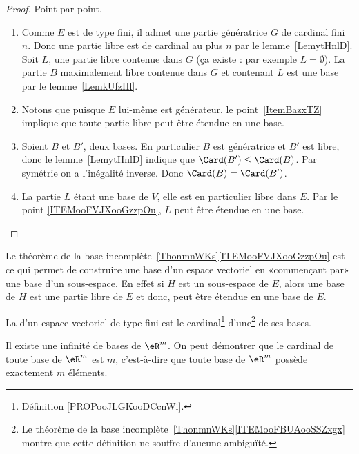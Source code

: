 \begin{proof}
	Point par point.
	\begin{enumerate}
		\item
		      Comme \( E\) est de type fini, il admet une partie génératrice \( G\) de cardinal fini \( n\). Donc une partie libre est de cardinal au plus \( n\) par le lemme~\ref{LemytHnlD}. Soit \( L\), une partie libre contenue dans \( G\) (ça existe : par exemple \( L=\emptyset\)). La partie \( B\) maximalement libre contenue dans \( G\) et contenant \( L\) est une base par le lemme~\ref{LemkUfzHl}.
		\item
		      Notons que puisque \( E\) lui-même est générateur, le point~\ref{ItemBazxTZ} implique que toute partie libre peut être étendue en une base.
		\item
		      Soient \( B\) et \( B'\), deux bases. En particulier \( B\) est génératrice et \( B'\) est libre, donc le lemme~\ref{LemytHnlD} indique que \( \Card(B')\leq \Card(B)\). Par symétrie on a l'inégalité inverse. Donc \( \Card(B)=\Card(B')\).
		\item
		      La partie \( L\) étant une base de \( V\), elle est en particulier libre dans \( E\). Par le point \ref{ITEMooFVJXooGzzpOu}, \( L\) peut être étendue en une base.
	\end{enumerate}
\end{proof}

\begin{remark}      \label{REMooYGJEooEcZQKa}
	Le théorème de la base incomplète~\ref{ThonmnWKs}\ref{ITEMooFVJXooGzzpOu} est ce qui permet de construire une base d'un espace vectoriel en «commençant par» une base d'un sous-espace. En effet si \( H\) est un sous-espace de \( E\), alors une base de \( H\) est une partie libre de \( E\) et donc, peut être étendue en une base de \( E\).
\end{remark}

\begin{definition}      \label{DEFooWRLKooArTpgh}
	La  d'un espace vectoriel de type fini est le cardinal\footnote{Définition \ref{PROPooJLGKooDCcnWi}.} d'une\footnote{Le théorème de la base incomplète~\ref{ThonmnWKs}\ref{ITEMooFBUAooSSZxgx} montre que cette définition ne souffre d'aucune ambiguïté.} de ses bases.
\end{definition}

Il existe une infinité de bases de \( \eR^m\). On peut démontrer que le cardinal de toute base de \( \eR^m\) est \( m\), c'est-à-dire que toute base de \( \eR^m\) possède exactement \( m\) éléments.

